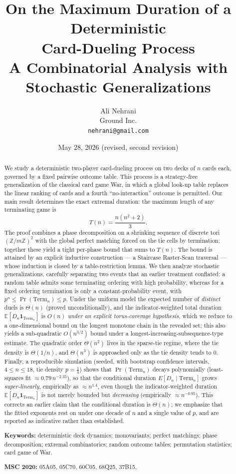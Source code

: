 \documentclass[11pt]{article}
\title{On the Maximum Duration of a Deterministic\\ Card-Dueling Process\\[4pt]
\large A Combinatorial Analysis with Stochastic Generalizations}
\author{Ali Nehrani\\ Ground Inc.\\ \texttt{nehrani@gmail.com}}
\date{May 28, 2026 (revised, second revision)}
\theoremstyle{definition}
\theoremstyle{remark}
\newcommand{\Term}{\mathrm{Term}}
\newcommand{\Z}{\mathbb{Z}}
\newcommand{\E}{\mathbb{E}}
\begin{document}
\maketitle

\begin{abstract}
We study a deterministic two-player card-dueling process on two decks of $n$ cards each,
governed by a fixed pairwise outcome table. This process is a strategy-free generalization of the
classical card game War, in which a global look-up table replaces the linear ranking of cards and
a fourth ``no-interaction'' outcome is permitted. Our main result determines the exact extremal
duration: the maximum length of any terminating game is
\[
T(n) = \frac{n(n^2 + 2)}{3}.
\]
The proof combines a phase decomposition on a shrinking sequence of discrete tori $(\Z/m\Z)^2$
with the global perfect matching forced on the tie cells by termination; together these yield
a tight per-phase bound that sums to $T(n)$. The bound is attained by an explicit inductive
construction --- a Staircase Raster-Scan traversal --- whose induction is closed by a table-restriction
lemma. We then analyze stochastic generalizations, carefully separating two events
that an earlier treatment conflated: a random table admits some terminating ordering with
high probability, whereas for a fixed ordering termination is only a constant-probability event,
with $p^n \le \Pr(\Term_n) \le p$. Under the uniform model the expected number of \emph{distinct} duels
is $\Theta(n)$ (proved unconditionally), and the indicator-weighted total duration $\E[D_n\mathbf 1_{\Term_n}]$
is $O(n)$ \emph{under an explicit torus-coverage hypothesis}, which we reduce to a one-dimensional bound on the
longest monotone chain in the revealed set; this also yields a sub-quadratic $O(n^{3/2})$ bound under
a longest-increasing-subsequence-type estimate. The quadratic order $\Theta(n^2)$ lives in the sparse-tie
regime, where the tie density is $\Theta(1/n)$, and $\Theta(n^3)$ is approached only as the tie density tends to
$0$. Finally, a reproducible simulation (seeded, with bootstrap confidence intervals, $4\le n\le 18$, tie
density $p=\tfrac14$) shows that $\Pr(\Term_n)$ decays polynomially (least-squares fit $\approx 0.79\,n^{-2.35}$),
so that the conditional duration $E[D_n\mid \Term_n]$ grows \emph{super-linearly}, empirically as $\approx n^{1.4}$,
even though the indicator-weighted duration $\E[D_n\mathbf 1_{\Term_n}]$ is not merely bounded but
\emph{decreasing} (empirically $\approx n^{-0.95}$). This corrects an earlier claim that the conditional
duration is $\Theta(n)$; we emphasize that the fitted exponents rest on under one decade of $n$ and a single
value of $p$, and are reported as indicative rather than established.

\medskip
\noindent\textbf{Keywords:} deterministic deck dynamics; monovariants; perfect matchings; phase decomposition;
extremal combinatorics; random outcome tables; permutation statistics; card game of War.

\noindent\textbf{MSC 2020:} 05A05, 05C70, 60C05, 68Q25, 37B15.
\end{abstract}
\end{document}
